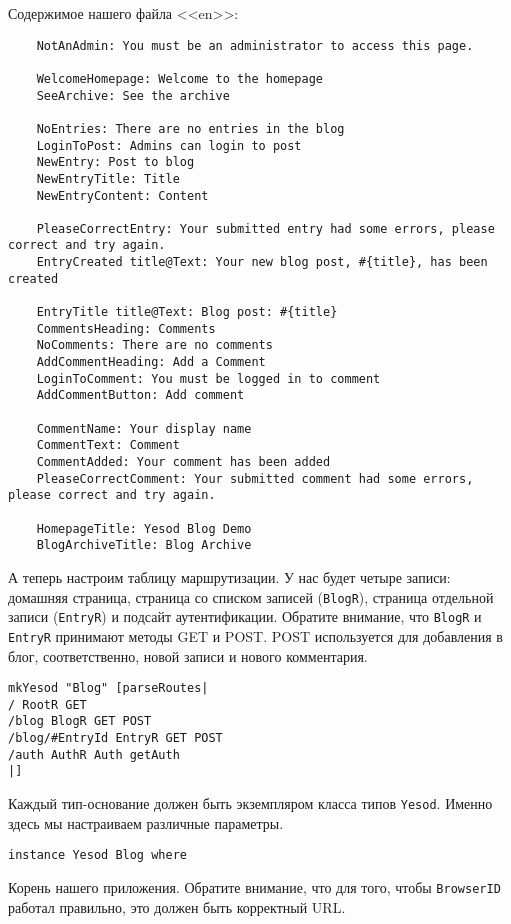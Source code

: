 Содержимое нашего файла <<en>>: 

\begin{lstlisting}
    NotAnAdmin: You must be an administrator to access this page.

    WelcomeHomepage: Welcome to the homepage
    SeeArchive: See the archive

    NoEntries: There are no entries in the blog
    LoginToPost: Admins can login to post
    NewEntry: Post to blog
    NewEntryTitle: Title
    NewEntryContent: Content

    PleaseCorrectEntry: Your submitted entry had some errors, please correct and try again.
    EntryCreated title@Text: Your new blog post, #{title}, has been created

    EntryTitle title@Text: Blog post: #{title}
    CommentsHeading: Comments
    NoComments: There are no comments
    AddCommentHeading: Add a Comment
    LoginToComment: You must be logged in to comment
    AddCommentButton: Add comment

    CommentName: Your display name
    CommentText: Comment
    CommentAdded: Your comment has been added
    PleaseCorrectComment: Your submitted comment had some errors, please correct and try again.

    HomepageTitle: Yesod Blog Demo
    BlogArchiveTitle: Blog Archive
\end{lstlisting}

А теперь настроим таблицу маршрутизации. У нас будет четыре записи: домашняя страница, страница со списком записей (\lstinline!BlogR!), страница отдельной записи (\lstinline!EntryR!) и подсайт аутентификации. Обратите внимание, что \lstinline!BlogR! и \lstinline!EntryR! принимают методы GET и POST. POST используется для добавления в блог, соответственно, новой записи и нового комментария.
 
\begin{lstlisting}
mkYesod "Blog" [parseRoutes|
/ RootR GET
/blog BlogR GET POST
/blog/#EntryId EntryR GET POST
/auth AuthR Auth getAuth
|]
\end{lstlisting}
 
Каждый тип-основание должен быть экземпляром класса типов \lstinline!Yesod!. Именно здесь мы настраиваем различные параметры.
 
\begin{lstlisting}
instance Yesod Blog where
\end{lstlisting}

Корень нашего приложения. Обратите внимание, что для того, чтобы \lstinline!BrowserID! работал правильно, это должен быть корректный URL.
 
